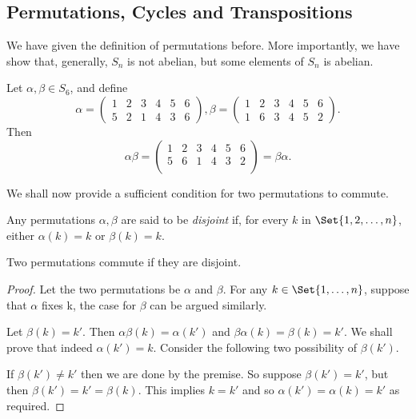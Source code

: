 \documentclass[main.tex]{subfiles}
\begin{document}
			\subsection{Permutations, Cycles and Transpositions}
				We have given the definition of permutations before. More importantly, we have show that, generally, $S_n$ is not abelian, but some elements of $S_n$ is abelian.
				\begin{example}
					Let $\alpha, \beta \in S_6$, and define
					\begin{equation*}
						\alpha =
						\begin{pmatrix}
							1 & 2 & 3 & 4 & 5 & 6\\
							5 & 2 & 1 & 4 & 3 & 6
						\end{pmatrix},
						\beta =
						\begin{pmatrix}
							1 & 2 & 3 & 4 & 5 & 6\\
							1 & 6 & 3 & 4 & 5 & 2
						\end{pmatrix}.
					\end{equation*}
					Then
					\begin{equation*}
						\alpha\beta = 
						\begin{pmatrix}
							1 & 2 & 3 & 4 & 5 & 6\\
							5 & 6 & 1 & 4 & 3 & 2\\
						\end{pmatrix}
						= \beta\alpha.
					\end{equation*}
				\end{example}
				We shall now provide a sufficient condition for two permutations to commute.
				\begin{definition}
					Any permutations $\alpha, \beta$ are said to be \textit{disjoint} if, for every $k$ in $\Set{1, 2, \ldots, n}$, either $\alpha(k) = k$ or $\beta(k) = k$.
				\end{definition}
				\begin{theorem}
					Two permutations commute if they are disjoint.
				\end{theorem}
				\begin{proof}
					Let the two permutations be $\alpha$ and $\beta$. For any $k \in \Set{1, \ldots, n}$, suppose that $\alpha$ fixes k, the case for $\beta$ can be argued similarly. 
					
					Let $\beta(k) = k'$. Then $\alpha\beta (k) = \alpha(k')$ and $\beta\alpha(k) = \beta(k) = k'$. We shall prove that indeed $\alpha(k') = k$. Consider the following two possibility of $\beta(k')$.
					
					If $\beta(k') \neq k'$ then we are done by the premise. So suppose $\beta(k') = k'$, but then $\beta(k') = k' = \beta(k)$. This implies $k = k'$ and so $\alpha(k') = \alpha(k) = k'$ as required.
				\end{proof}
			
\end{document}
